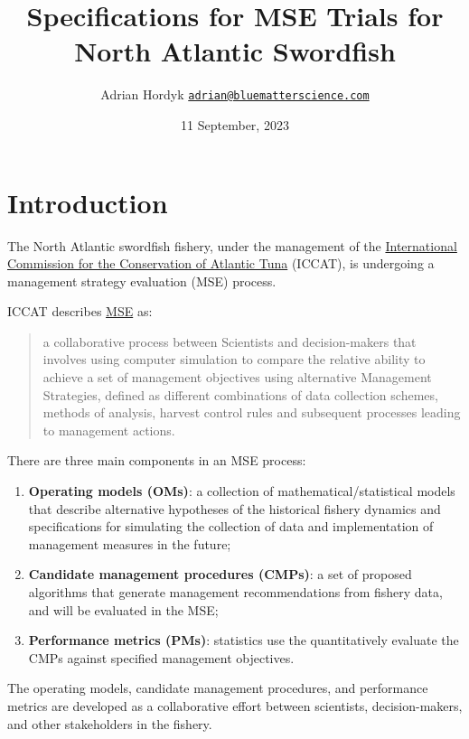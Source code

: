 \documentclass[
]{article}
\title{Specifications for MSE Trials for North Atlantic Swordfish}
\author{Adrian Hordyk \href{mailto:adrian@bluematterscience.com}{\nolinkurl{adrian@bluematterscience.com}}}
\date{11 September, 2023}
\providecommand{\tightlist}{%
  \setlength{\itemsep}{0pt}\setlength{\parskip}{0pt}}
\begin{document}
\maketitle

{
\hypersetup{linkcolor=}
\setcounter{tocdepth}{2}
\tableofcontents
}
\hypertarget{introduction}{%
\section{Introduction}\label{introduction}}

The North Atlantic swordfish fishery, under the management of the \href{https://www.iccat.int/en/index.asp}{International Commission for the Conservation of Atlantic Tuna} (ICCAT), is undergoing a management strategy evaluation (MSE) process.

ICCAT describes \href{https://www.iccat.int/mse/en/index.asp}{MSE} as:

\begin{quote}
a collaborative process between Scientists and decision-makers that involves using computer simulation to compare the relative ability to achieve a set of management objectives using alternative Management Strategies, defined as different combinations of data collection schemes, methods of analysis, harvest control rules and subsequent processes leading to management actions.
\end{quote}

There are three main components in an MSE process:

\begin{enumerate}
\def\labelenumi{\arabic{enumi}.}
\tightlist
\item
  \textbf{Operating models (OMs)}: a collection of mathematical/statistical models that describe alternative hypotheses of the historical fishery dynamics and specifications for simulating the collection of data and implementation of management measures in the future;
\item
  \textbf{Candidate management procedures (CMPs)}: a set of proposed algorithms that generate management recommendations from fishery data, and will be evaluated in the MSE;
\item
  \textbf{Performance metrics (PMs)}: statistics use the quantitatively evaluate the CMPs against specified management objectives.
\end{enumerate}

The operating models, candidate management procedures, and performance metrics are developed as a collaborative effort between scientists, decision-makers, and other stakeholders in the fishery.
\end{document}
